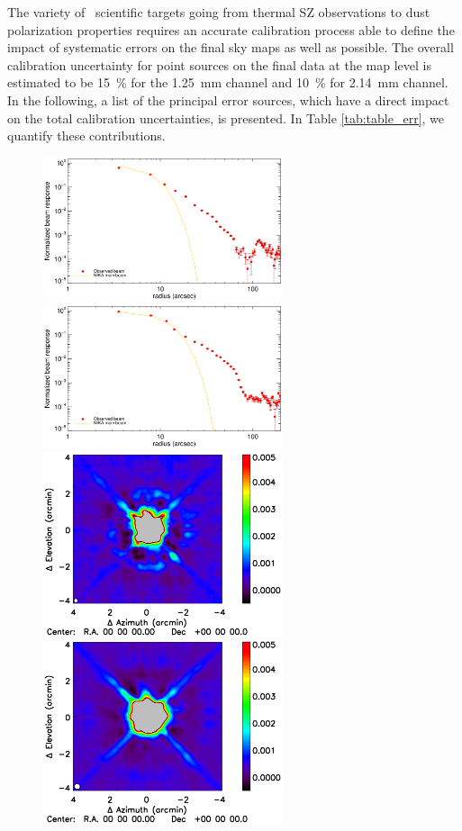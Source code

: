%
The variety of \NIKA\ scientific targets going from thermal SZ observations to
dust polarization properties requires an accurate calibration process able
to define the impact of systematic errors on the final sky
maps as well as possible. The overall calibration uncertainty for point sources on the final data 
at the map level is estimated to be 
15~\% for the 1.25~mm channel and 10~\% for 2.14~mm channel.
In the following, a list of the principal error sources, which have a
direct impact on the total calibration uncertainties, is presented. In Table
\ref{tab:table_err}, we quantify these contributions.

\begin{figure}[t!]
\begin{center}
\includegraphics[width=7cm]{figures/beam_profile_1mm.eps} 
\includegraphics[width=7cm]{figures/beam_profile_2mm.eps} \\
\includegraphics[width=7cm,trim=0cm 0.35cm 0cm 0cm,clip]{figures/Saturn_mapbeam_1mm.ps} 
\includegraphics[width=7cm,trim=0cm 0.35cm 0cm 0cm,clip]{figures/Saturn_mapbeam_2mm.ps} 

\end{center}
\end{figure}
